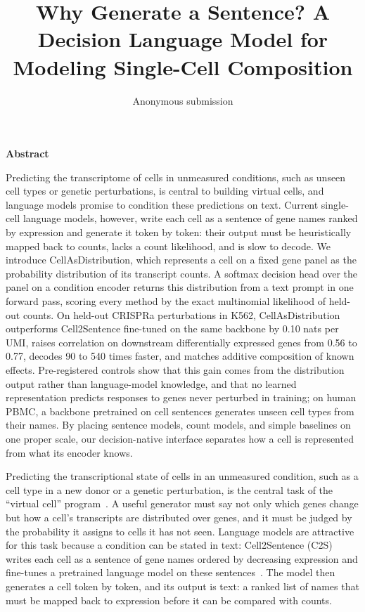 \documentclass[10pt]{article}
\title{Why Generate a Sentence? A Decision Language Model for Modeling Single-Cell Composition}
\author{Anonymous submission}
\date{}
\makeatletter
\renewenvironment{abstract}{\begin{center}\textbf{Abstract}\end{center}\noindent\ignorespaces}{\par}   %
\renewcommand\section{\@startsection{section}{1}{\z@}{-3.5ex \@plus -1ex \@minus -.2ex}{2.3ex \@plus.2ex}{\normalfont\Large\bfseries\raggedright\hyphenpenalty=10000}}
\makeatother
\begin{document}
\maketitle
\thispagestyle{empty}

\begin{abstract}
Predicting the transcriptome of cells in unmeasured conditions, such as unseen cell types or genetic perturbations, is central to building virtual cells, and language models promise to condition these predictions on text. Current single-cell language models, however, write each cell as a sentence of gene names ranked by expression and generate it token by token: their output must be heuristically mapped back to counts, lacks a count likelihood, and is slow to decode. We introduce CellAsDistribution, which represents a cell on a fixed gene panel as the probability distribution of its transcript counts. A softmax decision head over the panel on a condition encoder returns this distribution from a text prompt in one forward pass, scoring every method by the exact multinomial likelihood of held-out counts. On held-out CRISPRa perturbations in K562, CellAsDistribution outperforms Cell2Sentence fine-tuned on the same backbone by 0.10 nats per UMI, raises correlation on downstream differentially expressed genes from 0.56 to 0.77, decodes 90 to 540 times faster, and matches additive composition of known effects. Pre-registered controls show that this gain comes from the distribution output rather than language-model knowledge, and that no learned representation predicts responses to genes never perturbed in training; on human PBMC, a backbone pretrained on cell sentences generates unseen cell types from their names. By placing sentence models, count models, and simple baselines on one proper scale, our decision-native interface separates how a cell is represented from what its encoder knows.
\end{abstract}
\clearpage
{}

\section{Introduction}
Predicting the transcriptional state of cells in an unmeasured condition, such as a cell type in a new donor or a genetic perturbation, is the central task of the ``virtual cell'' program~\citep{bunne2024virtualcell}.
A useful generator must say not only which genes change but how a cell's transcripts are distributed over genes, and it must be judged by the probability it assigns to cells it has not seen.
Language models are attractive for this task because a condition can be stated in text: Cell2Sentence (C2S) writes each cell as a sentence of gene names ordered by decreasing expression and fine-tunes a pretrained language model on these sentences~\citep{levine2024cell2sentence,rizvi2025c2sscale}.
The model then generates a cell token by token, and its output is text: a ranked list of names that must be mapped back to expression before it can be compared with counts.
\end{document}
